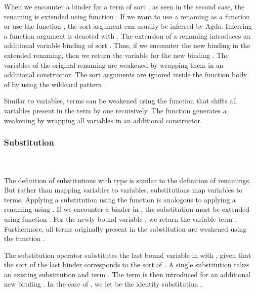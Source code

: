 \noindent When we encounter a binder for a term of sort , as seen in the second case, the renaming is extended using function . 
If we want to use a renaming as a function or use the function , the sort argument  can usually be inferred by Agda. 
Inferring a function argument is denoted with \Sym{\_}. 
\Frenext
The extension of a renaming introduces an additional variable binding of sort . Thus, if we encounter the new binding  in the extended renaming, then we return the variable for the new binding . 
The variables  of the original renaming  are weakened by wrapping them in an additional  constructor. The sort arguments are ignored inside the function body of  by using the wildcard pattern \Sym{\_}.

\noindent Similar to variables, terms can be weakened using the function  that shifts all variables present in the term by one recursively. 
\Fwk 
The function  generates a weakening by wrapping all variables in an additional  constructor.
\Frenwk

\subsubsection{Substitution}\hfill\\\\
The definition of substitutions  with type    is similar to the definition of renamings. 
But rather than mapping variables to variables, substitutions map variables to terms.
\FSub
Applying a substitution using the  function is analogous to applying a renaming using . 
If we encounter a binder in , the substitution must be extended using function .
\Fext
For the newly bound variable , we return the variable term .  
Furthermore, all terms  originally present in the substitution  are weakened using the function .

\noindent The substitution operator  \Data{[}  \Data{]} substitutes the last bound variable in  with , given that the sort of the last binder corresponds to the sort of .
\Fsubs
A single substitution  takes an existing substitution  and term . The term  is then introduced for an additional new binding . 
\Fsinglesub
In the case of \Data{\_[\_]}, we let  be the identity substitution \Fidsub.

